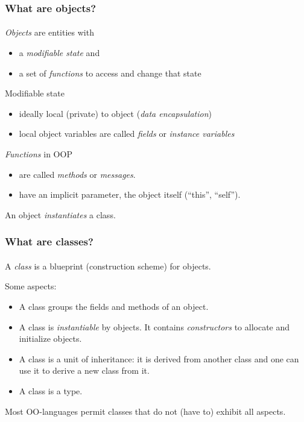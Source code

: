 \documentclass{beamer}
\begin{document}
\begin{frame}[fragile]
\frametitle{What are objects?}
\framesubtitle{}

\emph{Objects} are entities with 
\begin{itemize}
  \item a \emph{modifiable state} and 
  \item a set of \emph{functions} to access and change that state
\end{itemize}

\pause\medskip

Modifiable state 
\begin{itemize}
  \item ideally local (private) to object (\emph{data encapsulation})
  \item local object variables are called \emph{fields} or
    \emph{instance variables} 
\end{itemize}

\pause\medskip

\emph{Functions} in OOP
\begin{itemize}
\item are called \textit{methods} or \textit{messages}.
\item have an implicit parameter, the object itself (``this'', ``self'').
\end{itemize}

\pause\medskip

An object \textit{instantiates} a class.
\end{frame}



\begin{frame}[fragile]
\frametitle{What are classes?}
\framesubtitle{}

A \emph{class} is a blueprint (construction scheme) for objects.

\bigskip

Some aspects:

\begin{itemize}
\item A class groups the fields and methods of an object.
\item A class is \textit{instantiable} by objects.
It contains \textit{constructors} to allocate and initialize objects.
\item A class is a unit of inheritance: it is derived from another
class and one can use it to derive a new class from it. 
\item A class is a type. 
\end{itemize}
\bigskip
Most OO-languages permit classes that do not (have to) exhibit all aspects. 
\end{frame}
\end{document}
